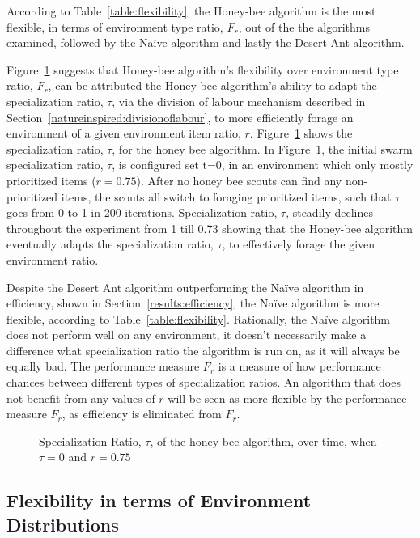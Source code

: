 According to Table~\ref{table:flexibility}, the Honey-bee algorithm is the most flexible, in terms of environment type ratio, $F_r$, out of the the algorithms examined, followed by the Na\"ive algorithm and lastly the Desert Ant algorithm. 

Figure~\ref{fig:specializationratioovertime} suggests that Honey-bee algorithm's flexibility over environment type ratio, $F_r$, can be attributed the Honey-bee algorithm's ability to adapt the specialization ratio, $\tau$, via the division of labour mechanism described in Section~\ref{natureinspired:divisionoflabour}, to more efficiently forage an environment of a given environment item ratio, $r$. Figure~\ref{fig:specializationratioovertime} shows the specialization ratio, $\tau$, for the honey bee algorithm. In Figure~\ref{fig:specializationratioovertime}, the initial swarm specialization ratio, $\tau$, is configured set t=0, in an environment which only mostly prioritized items ($r=0.75$). After no honey bee scouts can find any non-prioritized items, the scouts all switch to foraging prioritized items, such that $\tau$ goes from 0 to 1 in 200 iterations. Specialization ratio, $\tau$, steadily declines throughout the experiment from 1 till 0.73 showing that the Honey-bee algorithm eventually adapts the specialization ratio, $\tau$, to effectively forage the given environment ratio. 

Despite the Desert Ant algorithm outperforming the Na\"ive algorithm in efficiency, shown in Section~\ref{results:efficiency}, the Na\"ive algorithm is more flexible, according to Table~\ref{table:flexibility}. Rationally, the Na\"ive algorithm does not perform well on any environment, it doesn't necessarily make a difference what specialization ratio the algorithm is run on, as it will always be equally bad. The performance measure $F_r$ is a measure of how performance chances between different types of specialization ratios. An algorithm that does not benefit from any values of $r$ will be seen as more flexible by the performance measure $F_r$, as efficiency is eliminated from $F_r$.

\begin{figure}[!htb]
\centering
\resizebox{\textwidth}{!}{}
\caption{Specialization Ratio, $\tau$, of the honey bee algorithm, over time, when $\tau=0$ and $r=0.75$}
\label{fig:specializationratioovertime}
\end{figure}


\subsection{Flexibility in terms of Environment Distributions}
\label{results:flexibility:environmentdistribution}

